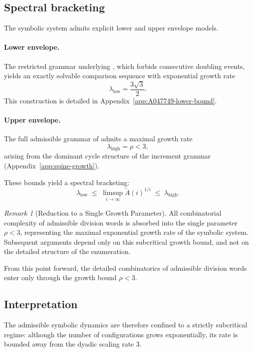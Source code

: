 \documentclass[12pt, oneside]{article}
\numberwithin{equation}{section}
\theoremstyle{definition}
\theoremstyle{plain}
\theoremstyle{remark}
\newtheorem*{remark}{Remark}
\begin{document}
\subsection{Spectral bracketing}

The symbolic system admits explicit lower and upper envelope models.

\paragraph{Lower envelope.}
The restricted grammar underlying , which forbids consecutive
doubling events, yields an exactly solvable comparison sequence with
exponential growth rate
\[
\lambda_{\mathrm{low}} = \frac{3\sqrt{3}}{2}.
\]
This construction is detailed in Appendix~\ref{app:A047749-lower-bound}.

\paragraph{Upper envelope.}
The full admissible grammar of  admits a maximal growth rate
\[
\lambda_{\mathrm{high}} = \rho < 3,
\]
arising from the dominant cycle structure of the increment grammar
(Appendix~\ref{app:spine-growth}).

\medskip

\noindent
These bounds yield a spectral bracketing:
\[
\lambda_{\mathrm{low}}
\;\le\;
\limsup_{i\to\infty} \widetilde A(i)^{1/i}
\;\le\;
\lambda_{\mathrm{high}}.
\]

\begin{remark}[Reduction to a Single Growth Parameter]
All combinatorial complexity of admissible division words is absorbed into
the single parameter $\rho < 3$, representing the maximal exponential growth
rate of the symbolic system. Subsequent arguments depend only on this
subcritical growth bound, and not on the detailed structure of the enumeration.
\end{remark}

\noindent
From this point forward, the detailed combinatorics of admissible division
words enter only through the growth bound $\rho < 3$.

\subsection*{Interpretation}

The admissible symbolic dynamics are therefore confined to a strictly
subcritical regime: although the number of configurations grows exponentially,
its rate is bounded away from the dyadic scaling rate $3$.
\end{document}
